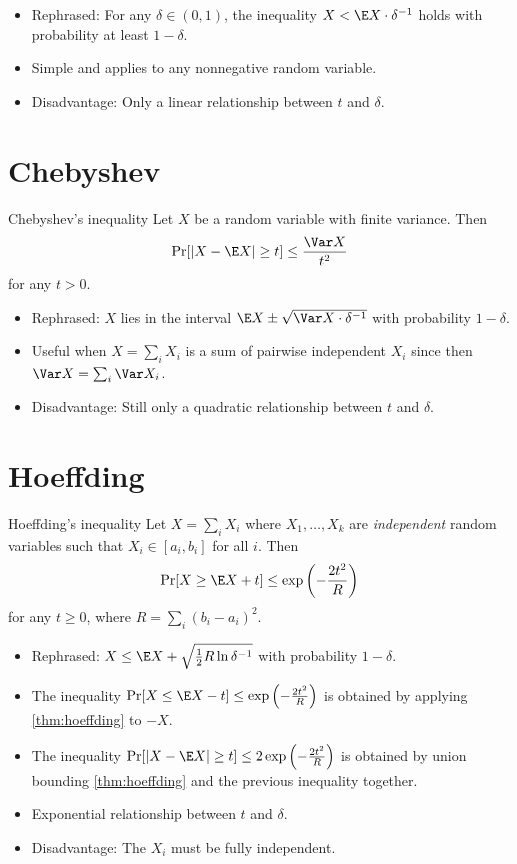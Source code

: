 \documentclass[11pt,a4paper]{article}
\begin{document}
\begin{itemize}
\item Rephrased: For any $\delta \in (0, 1)$, the inequality $X < \E X \cdot \delta^{-1}$ holds with probability at least $1 - \delta$.
\item Simple and applies to any nonnegative random variable.
\item Disadvantage: Only a linear relationship between $t$ and $\delta$.
\end{itemize}

\section*{Chebyshev}

\begin{thmbox}{Chebyshev's inequality}
  Let $X$ be a random variable with finite variance.
  Then
  \[\Pr[|X - \E X| \ge t] \le \frac{\Var X}{t^2}\]
  for any $t > 0$.
\end{thmbox}

\begin{itemize}
\item Rephrased: $X$ lies in the interval $\E X \pm \sqrt{\Var X \cdot \delta^{-1}}$ with probability $1 - \delta$.
\item Useful when $X = \sum_i X_i$ is a sum of pairwise independent $X_i$ since then $\Var X = \sum_i \Var X_i$.
\item Disadvantage: Still only a quadratic relationship between $t$ and $\delta$.
\end{itemize}

\section*{Hoeffding}

\begin{thmbox}[label=thm:hoeffding]{Hoeffding's inequality}
  Let $X = \sum_i X_i$ where $X_1, \dots, X_k$ are \emph{independent} random variables such that $X_i \in [a_i, b_i]$ for all $i$.
  Then
  \[\Pr[X \ge \E X + t] \le \exp\left(-\frac{2t^2}{R}\right)\]
  for any $t \ge 0$, where $R = \sum_i (b_i - a_i)^2$.
\end{thmbox}
\begin{itemize}
\item Rephrased: $X \le \E X + \sqrt{\frac12 R \ln \delta^{-1}}$ with probability $1 - \delta$.
\item The inequality $\Pr[X \le \E X - t] \le \exp\left(-\frac{2t^2}{R}\right)$ is obtained by applying \cref{thm:hoeffding} to $-X$.
\item The inequality $\Pr[|X - \E X| \ge t] \le 2\exp\left(-\frac{2t^2}{R}\right)$ is obtained by union bounding \cref{thm:hoeffding} and the previous inequality together.
\item Exponential relationship between $t$ and $\delta$.
\item Disadvantage: The $X_i$ must be fully independent.
\end{itemize}
\end{document}
